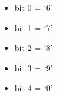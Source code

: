 \begin{itemize}
\item[] bit 0 = ‘6’
\item[] bit 1 = ‘7’
\item[] bit 2 = ‘8’
\item[] bit 3 = ‘9’
\item[] bit 4 = ‘0’
\end{itemize}

